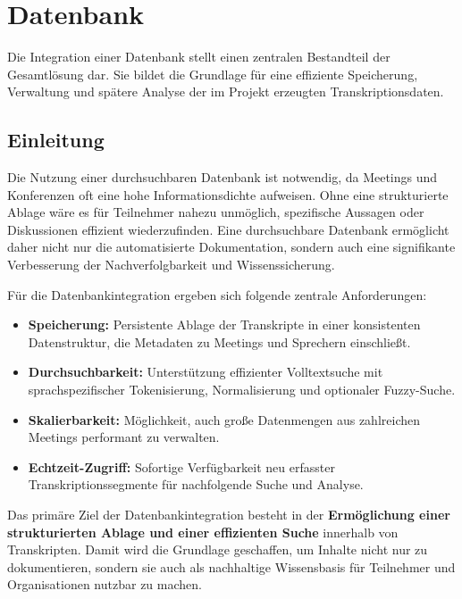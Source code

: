 
\chapter{Datenbank}
\label{chap:datenbank}

Die Integration einer Datenbank stellt einen zentralen Bestandteil der Gesamtlösung dar.
Sie bildet die Grundlage für eine effiziente Speicherung, Verwaltung und spätere Analyse
der im Projekt erzeugten Transkriptionsdaten.

\section{Einleitung}
\label{sec:einleitung}

Die Nutzung einer durchsuchbaren Datenbank ist notwendig, da Meetings und Konferenzen
oft eine hohe Informationsdichte aufweisen. Ohne eine strukturierte Ablage wäre es für
Teilnehmer nahezu unmöglich, spezifische Aussagen oder Diskussionen effizient
wiederzufinden. Eine durchsuchbare Datenbank ermöglicht daher nicht nur die
automatisierte Dokumentation, sondern auch eine signifikante Verbesserung
der Nachverfolgbarkeit und Wissenssicherung.

Für die Datenbankintegration ergeben sich folgende zentrale Anforderungen:

\begin{itemize}
    \item \textbf{Speicherung:} Persistente Ablage der Transkripte in einer konsistenten Datenstruktur, die Metadaten zu Meetings und Sprechern einschließt.
    \item \textbf{Durchsuchbarkeit:} Unterstützung effizienter Volltextsuche mit sprachspezifischer Tokenisierung, Normalisierung und optionaler Fuzzy-Suche.
    \item \textbf{Skalierbarkeit:} Möglichkeit, auch große Datenmengen aus zahlreichen Meetings performant zu verwalten.
    \item \textbf{Echtzeit-Zugriff:} Sofortige Verfügbarkeit neu erfasster Transkriptionssegmente für nachfolgende Suche und Analyse.
\end{itemize}

Das primäre Ziel der Datenbankintegration besteht in der
\textbf{Ermöglichung einer strukturierten Ablage und einer effizienten Suche}
innerhalb von Transkripten. Damit wird die Grundlage geschaffen,
um Inhalte nicht nur zu dokumentieren, sondern sie auch als
nachhaltige Wissensbasis für Teilnehmer und Organisationen nutzbar zu machen.



